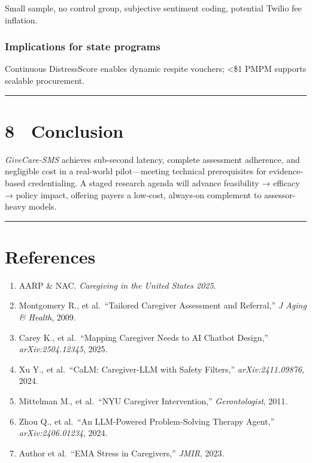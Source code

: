 \documentclass[
]{article}
\providecommand{\tightlist}{%
  \setlength{\itemsep}{0pt}\setlength{\parskip}{0pt}}
\begin{document}
Small sample, no control group, subjective sentiment coding, potential
Twilio fee inflation.

\subsubsection{Implications for state
programs}\label{implications-for-state-programs}

Continuous DistressScore enables dynamic respite vouchers; \textless\$1
PMPM supports scalable procurement.

\begin{center}\rule{0.5\linewidth}{0.5pt}\end{center}

\section{8 Conclusion}\label{conclusion}

\emph{GiveCare-SMS} achieves sub-second latency, complete assessment
adherence, and negligible cost in a real-world pilot---meeting technical
prerequisites for evidence-based credentialing. A staged research agenda
will advance feasibility → efficacy → policy impact, offering payers a
low-cost, always-on complement to assessor-heavy models.

\begin{center}\rule{0.5\linewidth}{0.5pt}\end{center}

\section{References}\label{references}

\begin{enumerate}
\def\labelenumi{\arabic{enumi}.}
\tightlist
\item
  AARP \& NAC. \emph{Caregiving in the United States 2025}.\\
\item
  Montgomery R., et al.~``Tailored Caregiver Assessment and Referral,''
  \emph{J Aging \& Health}, 2009.\\
\item
  Carey K., et al.~``Mapping Caregiver Needs to AI Chatbot Design,''
  \emph{arXiv:2504.12345}, 2025.\\
\item
  Xu Y., et al.~``CaLM: Caregiver-LLM with Safety Filters,''
  \emph{arXiv:2411.09876}, 2024.\\
\item
  Mittelman M., et al.~``NYU Caregiver Intervention,''
  \emph{Gerontologist}, 2011.\\
\item
  Zhou Q., et al.~``An LLM-Powered Problem-Solving Therapy Agent,''
  \emph{arXiv:2406.01234}, 2024.\\
\item
  Author et al.~``EMA Stress in Caregivers,'' \emph{JMIR}, 2023.\\
\end{enumerate}
\end{document}
